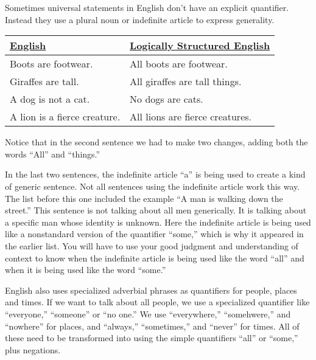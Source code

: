 Sometimes universal statements in English don't have an explicit quantifier. Instead they use a plural noun or indefinite article to express generality. 

\begin{longtabu}{p{.5\linewidth}p{.5\linewidth}}
\underline{English} &
\underline{Logically Structured English} \\
\endhead 
Boots are footwear. &
All boots are footwear.\\

Giraffes are tall. &
All giraffes are tall things.\\

A dog is not a cat. & 
No dogs are cats.\\

A lion is a fierce creature. &
All lions are fierce creatures.\\

\end{longtabu}

\noindent Notice that in the second sentence we had to make two changes, adding both the words ``All'' and ``things.''

In the last two sentences, the indefinite article ``a'' is being used to create a kind of generic sentence. Not all sentences using the indefinite article work this way. The list before this one included the example ``A man is walking down the street.'' This sentence is not talking about all men generically. It is talking about a specific man whose identity is unknown. Here the indefinite article is being used like a nonstandard version of the quantifier ``some,'' which is why it appeared in the earlier list. You will have to use your good judgment and understanding of context to know when the indefinite article is being used like the word ``all'' and when it is being used like the word ``some.''

English also uses specialized adverbial phrases as quantifiers for people, places and times. If we want to talk about all people, we use a specialized quantifier like ``everyone,'' ``someone'' or ``no one.'' We use ``everywhere,'' ``somehwere,'' and ``nowhere'' for places, and ``always,'' ``sometimes,'' and ``never'' for times.  All of these need to be transformed into using the simple quantifiers ``all'' or ``some,'' plus negations.  


